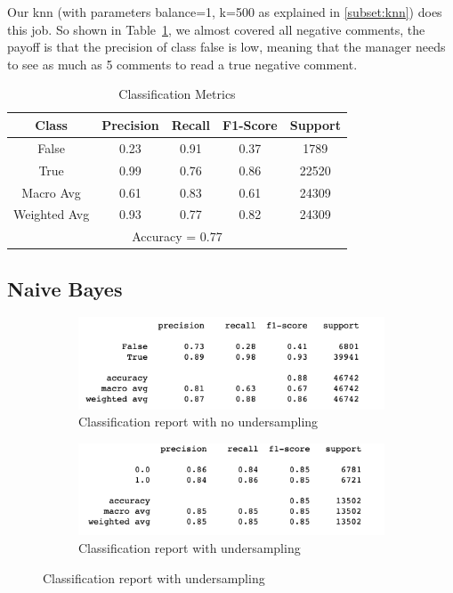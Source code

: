 \documentclass{article}
\begin{document}
Our knn (with parameters balance=1, k=500 as explained in \ref{subset:knn}) does this job. So shown
in Table~\ref{tab:knn}, we almost covered all negative comments,
the payoff is that the precision of class false is low, meaning
that the manager needs to see as much as 5 comments to read a true negative
comment.

\begin{table}[h]
  \centering
  \begin{tabular}{ccccc}
  \hline
  Class & Precision & Recall & F1-Score & Support \\
  \hline
  False & 0.23 & 0.91 & 0.37 & 1789 \\
  True & 0.99 & 0.76 & 0.86 & 22520 \\
  \hline
  Macro Avg & 0.61 & 0.83 & 0.61 & 24309 \\
  Weighted Avg & 0.93 & 0.77 & 0.82 & 24309 \\
  \hline
  \multicolumn{5}{c}{Accuracy = 0.77} \\
  \hline
  \end{tabular}
  \caption{Classification Metrics}
  \label{tab:knn}
\end{table}

\subsection{Naive Bayes}

\begin{figure}[H]
  \centering
  \begin{subfigure}[b]{0.4\textwidth}
    \centering
    \includegraphics[width=\textwidth]{class_report_nb_no_strat.png}
    \caption{Classification report with no undersampling}
    \label{fig:image1_label}
  \end{subfigure}
  \hfill
  \begin{subfigure}[b]{0.4\textwidth}
    \centering
    \includegraphics[width=\textwidth]{class_report_nb_strat.png}
    \caption{Classification report with undersampling}
    \label{fig:image2_label}
  \end{subfigure}
\end{figure}
\end{document}
